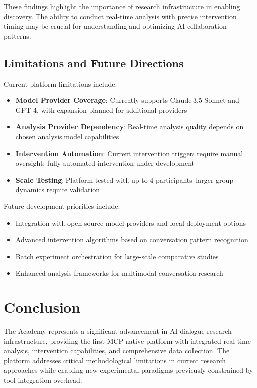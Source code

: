 \documentclass[11pt,letterpaper]{article}
\newcommand{\theacademy}{The Academy}
\newcommand{\mcp}{MCP}
\begin{document}
These findings highlight the importance of research infrastructure in enabling discovery. The ability to conduct real-time analysis with precise intervention timing may be crucial for understanding and optimizing AI collaboration patterns.

\subsection{Limitations and Future Directions}

Current platform limitations include:

\begin{itemize}
    \item \textbf{Model Provider Coverage}: Currently supports Claude 3.5 Sonnet and GPT-4, with expansion planned for additional providers
    \item \textbf{Analysis Provider Dependency}: Real-time analysis quality depends on chosen analysis model capabilities
    \item \textbf{Intervention Automation}: Current intervention triggers require manual oversight; fully automated intervention under development
    \item \textbf{Scale Testing}: Platform tested with up to 4 participants; larger group dynamics require validation
\end{itemize}

Future development priorities include:
\begin{itemize}
    \item Integration with open-source model providers and local deployment options
    \item Advanced intervention algorithms based on conversation pattern recognition
    \item Batch experiment orchestration for large-scale comparative studies
    \item Enhanced analysis frameworks for multimodal conversation research
\end{itemize}

\section{Conclusion}

\theacademy{} represents a significant advancement in AI dialogue research infrastructure, providing the first \mcp{}-native platform with integrated real-time analysis, intervention capabilities, and comprehensive data collection. The platform addresses critical methodological limitations in current research approaches while enabling new experimental paradigms previously constrained by tool integration overhead.
\end{document}
